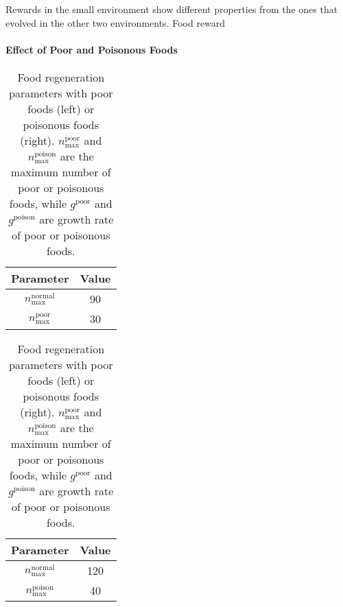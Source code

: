 Rewards in the small environment show different properties from the ones that evolved in the other two environments. Food reward

\paragraph{Effect of Poor and Poisonous Foods}

\begin{table}[t]
  \begin{subtable}[h]{0.45\columnwidth}
    \centering
    \begin{tabular}{cc}
      \toprule
      Parameter & Value \\
      \midrule
      $n_{\textrm{max}}^{\textrm{normal}}$ & 90 \\
      $n_{\textrm{max}}^{\textrm{poor}}$ & 30 \\
      \bottomrule
    \end{tabular}
  \end{subtable}
  \begin{subtable}[h]{0.45\columnwidth}
    \centering
    \begin{tabular}{cc}
      \toprule
      Parameter & Value \\
      \midrule
      $n_{\textrm{max}}^{\textrm{normal}}$ & 120 \\
      $n_{\textrm{max}}^{\textrm{poison}}$ & 40 \\
      \bottomrule
    \end{tabular}
  \end{subtable}
  \caption{
    Food regeneration parameters with poor foods (left) or poisonous foods (right).
    $n_{\textrm{max}}^{\textrm{poor}}$ and $n_{\textrm{max}}^{\textrm{poison}}$ are the maximum number of poor or poisonous foods, while $g^{\textrm{poor}}$ and $g^{\textrm{poison}}$ are growth rate of poor or poisonous foods.
  }\label{table:pp}
\end{table}



